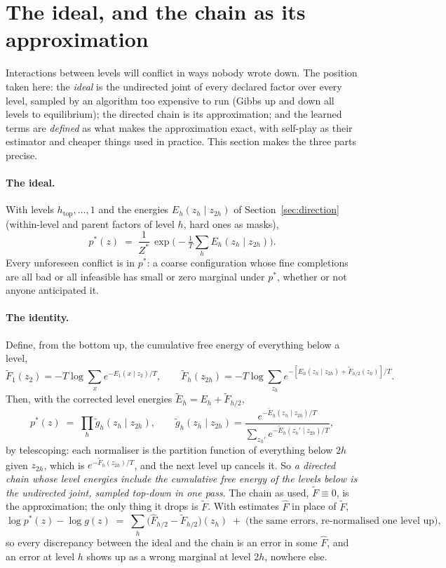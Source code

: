 \documentclass[11pt]{article}
\newcommand{\1}{\mathds{1}}
\begin{document}
\section{The ideal, and the chain as its approximation}
\label{sec:ideal}

Interactions between levels will conflict in ways nobody wrote down. The
position taken here: the \emph{ideal} is the undirected joint of every declared
factor over every level, sampled by an algorithm too expensive to run
(Gibbs up and down all levels to equilibrium); the directed chain is its
approximation; and the learned terms are \emph{defined} as what makes the
approximation exact, with self-play as their estimator and cheaper things used
in practice. This section makes the three parts precise.

\paragraph{The ideal.} With levels $h_{\text{top}}, \dots, 1$ and the energies
$E_h(z_h \mid z_{2h})$ of Section~\ref{sec:direction} (within-level and parent
factors of level $h$, hard ones as masks),
\[
  p^*(z) \;=\; \frac{1}{Z^*}\, \exp\!\Big(-\tfrac1T \sum_h E_h(z_h \mid z_{2h})\Big).
\]
Every unforeseen conflict is in $p^*$: a coarse configuration whose fine
completions are all bad or all infeasible has small or zero marginal under
$p^*$, whether or not anyone anticipated it.

\paragraph{The identity.} Define, from the bottom up, the cumulative free
energy of everything below a level,
\[
  \tilde F_{1}(z_2) = -T\log \sum_{x} e^{-E_1(x \mid z_2)/T},
  \qquad
  \tilde F_{h}(z_{2h}) = -T\log \sum_{z_h} e^{-[E_h(z_h \mid z_{2h}) + \tilde F_{h/2}(z_h)]/T}.
\]
Then, with the corrected level energies $\tilde E_h = E_h + \tilde F_{h/2}$,
\begin{equation}
  p^*(z) \;=\; \prod_h \tilde g_h(z_h \mid z_{2h}),
  \qquad
  \tilde g_h(z_h \mid z_{2h}) = \frac{e^{-\tilde E_h(z_h \mid z_{2h})/T}}{\sum_{z_h'} e^{-\tilde E_h(z_h' \mid z_{2h})/T}} ,
  \label{eq:telescope}
\end{equation}
by telescoping: each normaliser is the partition function of everything below
$2h$ given $z_{2h}$, which is $e^{-\tilde F_h(z_{2h})/T}$, and the next level up
cancels it. So \emph{a directed chain whose level energies include the
cumulative free energy of the levels below is the undirected joint, sampled
top-down in one pass}. The chain as used, $\tilde F \equiv 0$, is the
approximation; the only thing it drops is $\tilde F$. With estimates $\hat F$ in
place of $\tilde F$,
\[
  \log p^*(z) - \log g(z) \;=\; \sum_h \big(\hat F_{h/2} - \tilde F_{h/2}\big)(z_h) \;+\; \text{(the same errors, re-normalised one level up)},
\]
so every discrepancy between the ideal and the chain is an error in some
$\hat F$, and an error at level $h$ shows up as a wrong marginal at level $2h$,
nowhere else.
\end{document}
